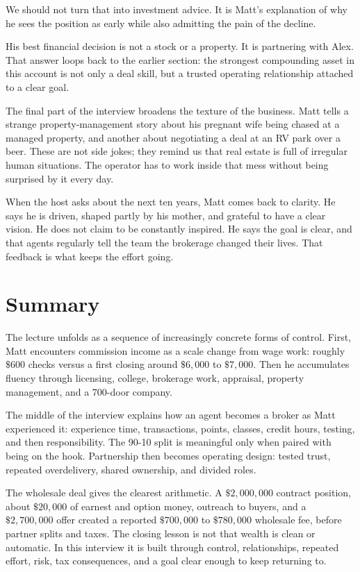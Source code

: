 We should not turn that into investment advice. It is Matt's explanation of why he sees the position as early while also admitting the pain of the decline.

His best financial decision is not a stock or a property. It is partnering with Alex. That answer loops back to the earlier section: the strongest compounding asset in this account is not only a deal skill, but a trusted operating relationship attached to a clear goal.

The final part of the interview broadens the texture of the business. Matt tells a strange property-management story about his pregnant wife being chased at a managed property, and another about negotiating a deal at an RV park over a beer. These are not side jokes; they remind us that real estate is full of irregular human situations. The operator has to work inside that mess without being surprised by it every day.

When the host asks about the next ten years, Matt comes back to clarity. He says he is driven, shaped partly by his mother, and grateful to have a clear vision. He does not claim to be constantly inspired. He says the goal is clear, and that agents regularly tell the team the brokerage changed their lives. That feedback is what keeps the effort going.

\section{Summary}

The lecture unfolds as a sequence of increasingly concrete forms of control. First, Matt encounters commission income as a scale change from wage work: roughly \(\$600\) checks versus a first closing around \(\$6{,}000\) to \(\$7{,}000\). Then he accumulates fluency through licensing, college, brokerage work, appraisal, property management, and a 700-door company.

The middle of the interview explains how an agent becomes a broker as Matt experienced it: experience time, transactions, points, classes, credit hours, testing, and then responsibility. The 90-10 split is meaningful only when paired with being on the hook. Partnership then becomes operating design: tested trust, repeated overdelivery, shared ownership, and divided roles.

The wholesale deal gives the clearest arithmetic. A \(\$2{,}000{,}000\) contract position, about \(\$20{,}000\) of earnest and option money, outreach to buyers, and a \(\$2{,}700{,}000\) offer created a reported \(\$700{,}000\) to \(\$780{,}000\) wholesale fee, before partner splits and taxes. The closing lesson is not that wealth is clean or automatic. In this interview it is built through control, relationships, repeated effort, risk, tax consequences, and a goal clear enough to keep returning to.